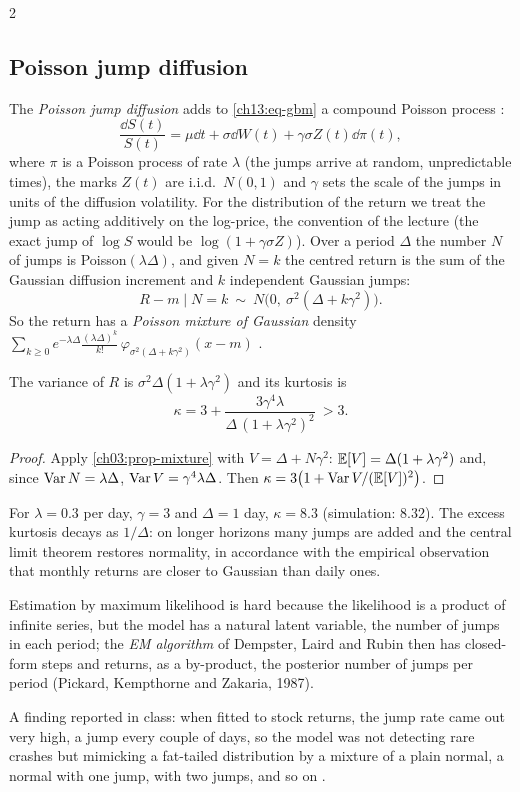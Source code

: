 \begin{paracol}{2}
\subsection{Poisson jump diffusion}\label{ch13:sec-pjd}
The \emph{Poisson jump diffusion} adds to \eqref{ch13:eq-gbm} a compound Poisson process :
\begin{equation}\label{ch13:eq-pjd}
  \frac{\dd S(t)}{S(t)}=\mu\dd t+\sigma\dd W(t)+\gamma\sigma Z(t)\dd\pi(t),
\end{equation}
where $\pi$ is a Poisson process of rate $\lambda$ (the jumps arrive at random, unpredictable times), the marks $Z(t)$ are i.i.d.\ $N(0,1)$ and
$\gamma$ sets the scale of the jumps in units of the diffusion volatility. For the distribution of the return we treat the jump as acting additively on the log-price, the convention of the
lecture (the exact jump of $\log S$ would be $\log(1+\gamma\sigma Z)$). Over a period $\Delta$ the number $N$ of jumps is Poisson$(\lambda\Delta)$, and given $N=k$ the centred return is the sum of the
Gaussian diffusion increment and $k$ independent Gaussian jumps:
\[
  R-m\mid N=k\ \sim\ N\bigl(0,\ \sigma^2(\Delta+k\gamma^2)\bigr).
\]
So the return has a \emph{Poisson mixture of Gaussian} density $\sum_{k\ge0}e^{-\lambda\Delta}\frac{(\lambda\Delta)^k}{k!}\,\varphi_{\sigma^2(\Delta+k\gamma^2)}(x-m)$ .

\begin{proposition}\label{ch13:prop-pjd}
The variance of $R$ is $\sigma^2\Delta(1+\lambda\gamma^2)$ and its kurtosis is
\[
  \kappa=3+\frac{3\gamma^4\lambda}{\Delta\,(1+\lambda\gamma^2)^2}\ >3 .
\]
\end{proposition}
\begin{proof}
Apply \cref{ch03:prop-mixture} with $V=\Delta+N\gamma^2$: $\mathbb{E}[V]=\Delta(1+\lambda\gamma^2)$ and, since $\operatorname{Var} N=\lambda\Delta$, $\operatorname{Var} V=\gamma^4\lambda\Delta$. Then
$\kappa=3\bigl(1+\operatorname{Var} V/(\mathbb{E}[V])^2\bigr)$.
\end{proof}
For $\lambda=0.3$ per day, $\gamma=3$ and $\Delta=1$ day, $\kappa=8.3$ (simulation: $8.32$). The excess kurtosis decays as $1/\Delta$: on longer horizons many jumps are added
and the central limit theorem restores normality, in accordance with the empirical observation that monthly returns are closer to Gaussian than daily ones.
\begin{secondary}
Estimation by maximum likelihood is hard because the likelihood is a product of infinite series, but the model has a natural latent variable, the number of jumps in each period; the
\emph{EM algorithm} of Dempster, Laird and Rubin then has closed-form steps and returns, as a by-product, the posterior number of jumps per period
 (Pickard, Kempthorne and Zakaria, 1987).
\end{secondary}
A finding reported in class: when fitted to stock returns, the jump rate came out very high, a jump every
couple of days, so the model was not detecting rare crashes but mimicking a fat-tailed distribution by a mixture of a plain normal, a normal with one jump, with two jumps, and so on
.


\end{paracol}
